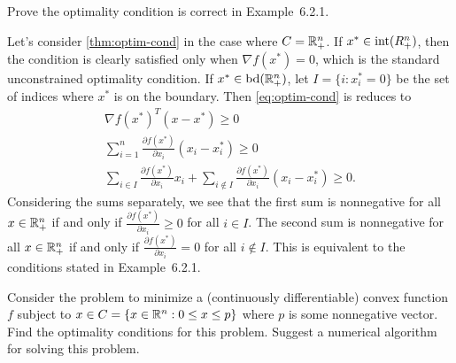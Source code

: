 \begin{exercise}
  Prove the optimality condition is correct in Example~6.2.1.
\end{exercise}

\begin{solution}
  Let's consider \cref{thm:optim-cond} in the case where $C = \mathbb{R}^n_+$.
  If $x^* \in \operatorname*{int}(R^n_+)$, then the condition is clearly satisfied only when $\nabla f(x^*) = 0$, which is the standard unconstrained optimality condition.
  If $x^* \in \operatorname*{bd}(\mathbb{R}^n_+)$, let $I = \{i : x^*_i = 0\}$ be the set of indices where $x^*$ is on the boundary.
  Then \cref{eq:optim-cond} is reduces to
  \begin{gather*}
    \nabla f(x^*)^T (x - x^*) \geq 0 \\
    \sum_{i=1}^n \frac{\partial f(x^*)}{\partial x_i} (x_i - x^*_i) \geq 0 \\
    \sum_{i \in I} \frac{\partial f(x^*)}{\partial x_i} x_i + \sum_{i \notin I} \frac{\partial f(x^*)}{\partial x_i} (x_i - x^*_i) \geq 0.
  \end{gather*}
  Considering the sums separately, we see that the first sum is nonnegative for all $x \in \mathbb{R}^n_+$ if and only if $\frac{\partial f(x^*)}{\partial x_i} \geq 0$ for all $i \in I$.
  The second sum is nonnegative for all $x \in \mathbb{R}^n_+$ if and only if $\frac{\partial f(x^*)}{\partial x_i} = 0$ for all $i \notin I$.
  This is equivalent to the conditions stated in Example~6.2.1.
\end{solution}

\begin{exercise}
  Consider the problem to minimize a (continuously differentiable) convex function $f$ subject to $x \in C = \{ x \in \mathbb{R}^n : 0 \leq x \leq p \}$ where $p$ is some nonnegative vector.
  Find the optimality conditions for this problem.
  Suggest a numerical algorithm for solving this problem.
\end{exercise}

